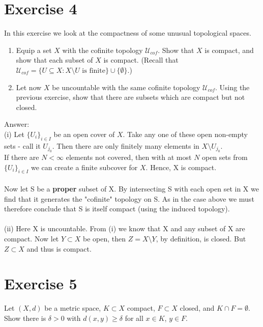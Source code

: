 \documentclass[12pt]{article}
\begin{document}
\newpage
\section*{Exercise 4}
\noindent
In this exercise we look at the compactness of some unusual topological spaces.
\begin{enumerate}[label=\roman*)]
\item Equip a set $X$ with the cofinite topology $\mathcal{U}_{cof}$. Show that $X$ is compact, and show that each subset of $X$ is compact. (Recall that $\mathcal{U}_{cof}=\{U\subseteq X:X\setminus U\text{ is finite}\}\cup\{\emptyset\}$.)
\item Let now $X$ be uncountable with the same cofinite topology $\mathcal{U}_{cof}$. Using the previous exercise, show that there are subsets which are compact but not closed.
\end{enumerate}

\vspace{1cm}
\noindent
Answer:\\
(i) Let $\{U_i\}_{i \in I}$ be an open cover of $X$.  Take any one of these open non-empty sets - call it $U_{j_0}$.  Then there are only finitely many elements in $X \setminus U_{j_0}$.\\
If there are $N < \infty$ elements not covered, then with at most $N$ open sets from $\{U_i\}_{i \in I}$ we can create a finite subcover for $X$.  Hence, X is compact.\\
\\
Now let S be a \textbf{proper} subset of X.  By intersecting S with each open set in X we find that it generates the "cofinite" topology on S.  As in the case above we must therefore conclude that
S is itself compact (using the induced topology).\\
\\
(ii) Here X is uncountable.  From (i) we know that X and any subset of X are compact.  Now let $Y \subset X$ be open, then $Z=X \setminus Y$, by definition, is closed.  But $Z \subset X$ and thus is compact.\\


\newpage
\section*{Exercise 5}
\noindent
Let $(X,d)$ be a metric space, $K\subset X$ compact, $F\subset X$ closed, and $K\cap F=\emptyset$. Show there is $\delta>0$ with $d(x,y)\geq\delta$ for all $x\in K$, $y\in F$.
\end{document}

